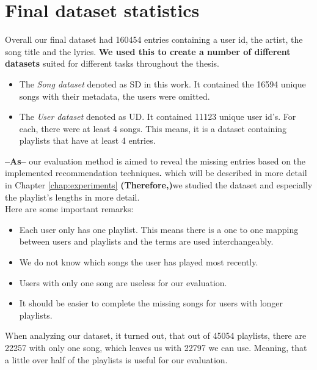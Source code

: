 \section{Final dataset statistics}
Overall our final dataset had 160454 entries containing a user id, the artist, the
song title and the lyrics. {\bf We used this to create a number of different datasets}
suited for different tasks throughout the thesis. \\
\begin{itemize}
    \item The \textit{Song dataset} denoted as SD in this work. It contained the
    16594 unique songs with their metadata, the users were omitted.
    \item The \textit{User dataset} denoted as UD. It contained 11123 unique user 
    id's. For each, there were at least 4 songs. This means, it is a dataset containing playlists that have at least 4 entries. 
\end{itemize}
 {\bf --As--} our  evaluation method is aimed to reveal the missing entries based on the
 implemented recommendation techniques{\bf .}  which will be described in more detail in
 Chapter \ref{chap:experiments} {\bf (Therefore,)}we studied the dataset and especially the playlist's
 lengths in more detail.\\
Here are some important remarks:
\begin{itemize}
    \item Each user only has one playlist. This means there is a one to one mapping between users and playlists and the terms are used interchangeably.
    \item We do not know which songs the user has played most recently.
    \item Users with only one song are useless for  our evaluation.
    \item {} It should be easier to complete the missing songs for users with longer playlists.
\end{itemize} 
When analyzing our dataset, it turned out, that out of 45054 playlists, there are 22257 with only one song, which leaves us with 22797 we can use. Meaning, that a little over half of the playlists is useful for our evaluation.

